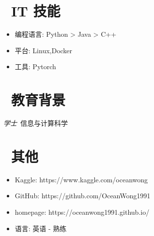 \documentclass{resume}
\begin{document}
\section{\faCogs\ IT 技能}
\begin{itemize}[parsep=0.5ex]
  \item 编程语言: Python > Java > C++
  \item 平台: Linux,Docker
  \item 工具: Pytorch
\end{itemize}

\section{\faGraduationCap\  教育背景}
\textit{学士}\ 信息与计算科学



\section{\faInfo\ 其他}
\begin{itemize}[parsep=0.5ex]
  \item Kaggle: https://www.kaggle.com/oceanwong
  \item GitHub: https://github.com/OceanWong1991
  \item homepage: https://oceanwong1991.github.io/
  \item 语言: 英语 - 熟练
\end{itemize}
\end{document}
